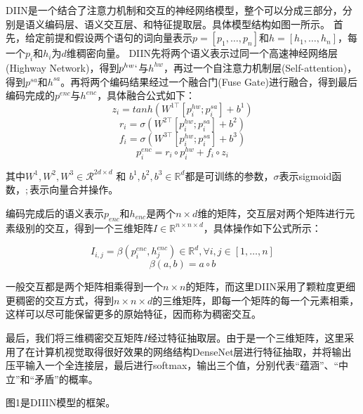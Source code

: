 \documentclass[UTF8,11pt,a4paper,nofonts]{ctexart}
\begin{document}
DIIN是一个结合了注意力机制和交互的神经网络模型，整个可以分成三部分，分别是语义编码层、语义交互层、和特征提取层。具体模型结构如图一所示。
首先，给定前提和假设两个语句的词向量表示$p=[p_1,\dots,p_n]$和$h=[h_1, \dots, h_n]$，每一个$p_i$和$h_i$为$d$维稠密向量。
DIIN先将两个语义表示过同一个高速神经网络层(Highway Network)，得到$p^{hw}`$与$h^{hw}$，再过一个自注意力机制层(Self-attention)，得到$p^{sa}$和$h^{sa}$。再将两个编码结果经过一个融合门(Fuse Gate)进行融合，得到最后编码完成的$p^{enc}$与$h^{enc}$，具体融合公式如下：
\begin{equation}
z_i = tanh(W^{1\top}[p^{hw}_i;p^{sa}_i]+b^1)
\end{equation}
\begin{equation}
r_i = \sigma(W^{2\top}[p^{hw}_i;p^{sa}_i]+b^2)
\end{equation}
\begin{equation}
f_i = \sigma(W^{3\top}[p^{hw}_i;p^{sa}_i]+b^3)
\end{equation}
\begin{equation}
p^{enc}_i = r_i \circ p^{hw}_i + f_i \circ z_i
\end{equation}

其中$W^1, W^2, W^3 \in \mathcal{R}^{2d\times d}$ 和 $b^1, b^2, b^3 \in \mathbb{R}^d$都是可训练的参数，$\sigma$表示sigmoid函数，$;$表示向量合并操作。

编码完成后的语义表示$p_{enc}$和$h_{enc}$是两个$n\times d$维的矩阵，交互层对两个矩阵进行元素级别的交互，得到一个三维矩阵$I \in \mathbb{R}^{n\times n \times d}$，具体操作如下公式所示：

\begin{equation}
I_{i,j} = \beta(p^{enc}_i, h^{enc}_j) \in \mathbb{R}^d, \forall i, j \in [1,\dots,n]
\end{equation}
\begin{equation}
\beta(a, b) = a \circ b
\end{equation}

一般交互都是两个矩阵相乘得到一个$n\times n$的矩阵，而这里DIIN采用了颗粒度更细更稠密的交互方式，得到$n\times n \times d$的三维矩阵，即每一个矩阵的每一个元素相乘，这样可以尽可能保留更多的原始特征，因而称为稠密交互。

最后，我们将三维稠密交互矩阵$I$经过特征抽取层。由于是一个三维矩阵，这里采用了在计算机视觉取得很好效果的网络结构DenseNet层进行特征抽取，并将输出压平输入一个全连接层，最后进行softmax，输出三个值，分别代表“蕴涵”、“中立”和“矛盾”的概率。

图1是DIIIN模型的框架。
\end{document}
